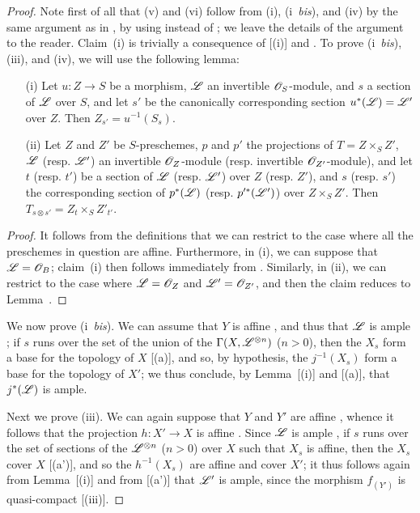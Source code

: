 \begin{proof}
Note first of all that (v) and (vi) follow from (i), (i~\emph{bis}), and (iv) by the same argument as in , by using  instead of ;
we leave the details of the argument to the reader.
Claim~(i) is trivially a consequence of [(i)] and .
To prove (i~\emph{bis}), (iii), and (iv), we will use the following lemma:
  \begin{lemma}[4.6.13.1]
  \label{II.4.6.13.1}
  \begin{enumerate}
    \item[\rm{(i)}] Let $u:Z\to S$ be a morphism, $\mathscr{L}$ an invertible $\mathscr{O}_S$-module, and $s$ a section of $\mathscr{L}$ over $S$, and let $s'$ be the canonically corresponding section $u^*(\mathscr{L})=\mathscr{L}'$ over $Z$.
      Then $Z_{s'}=u^{-1}(S_s)$.
    \item[\rm{(ii)}] Let $Z$ and $Z'$ be $S$-preschemes, $p$ and $p'$ the projections of $T=Z\times_S Z'$, $\mathscr{L}$ (resp. $\mathscr{L}'$) an invertible $\mathscr{O}_Z$-module (resp. invertible $\mathscr{O}_{Z'}$-module), and let $t$ (resp. $t'$) be a section of $\mathscr{L}$ (resp. $\mathscr{L}'$) over $Z$ (resp. $Z'$), and $s$ (resp. $s'$) the corresponding section of $p^*(\mathscr{L})$ (resp. $p'^*(\mathscr{L}')$) over $Z\times_S Z'$.
      Then $T_{s\otimes s'}=Z_t\times_S Z'_{t'}$.
  \end{enumerate}
  \end{lemma}

  \begin{proof}
  It follows from the definitions that we can restrict to the case where all the preschemes in question are affine.
  Furthermore, in (i), we can suppose that $\mathscr{L}=\mathscr{O}_B$;
  claim~(i) then follows immediately from .
  Similarly, in (ii), we can restrict to the case where $\mathscr{L}=\mathscr{O}_Z$ and $\mathscr{L}'=\mathscr{O}_{Z'}$, and then the claim reduces to Lemma~.
  \end{proof}

We now prove (i~\emph{bis}).
We can assume that $Y$ is affine , and thus that $\mathscr{L}$ is ample ;
if $s$ runs over the set of the union of the $\Gamma(X,\mathscr{L}^{\otimes n})$ ($n>0$), then the $X_s$ form a base for the topology of $X$ [(a)], and so, by hypothesis, the $j^{-1}(X_s)$ form a base for the topology of $X'$;
we thus conclude, by Lemma~[(i)] and [(a)], that $j^*(\mathscr{L})$ is ample.

Next we prove (iii).
We can again suppose that $Y$ and $Y'$ are affine , whence it follows that the projection $h:X'\to X$ is affine .
Since $\mathscr{L}$ is ample , if $s$ runs over the set of sections of the $\mathscr{L}^{\otimes n}$ ($n>0$) over $X$ such that $X_s$ is affine, then the $X_s$ cover $X$ [(a')], and so the $h^{-1}(X_s)$ are affine  and cover $X'$;
it thus follows again from Lemma~[(i)] and from [(a')] that $\mathscr{L}'$ is ample, since the morphism $f_{(Y')}$ is quasi-compact [(iii)].


\end{proof}
